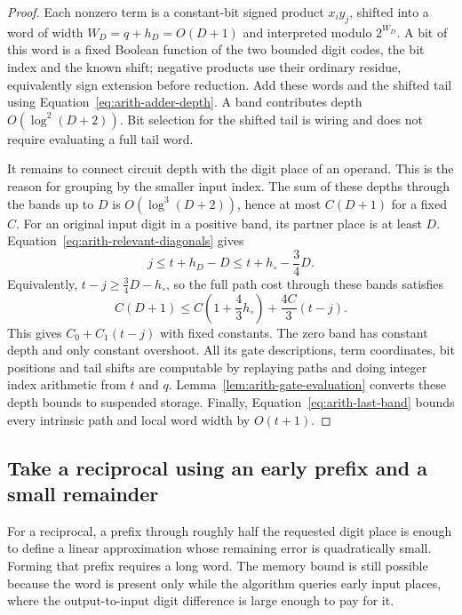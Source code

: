 \begin{proof}
Each nonzero term is a constant-bit signed product $x_i y_j$,
shifted into a word of width $W_D=q+h_D=O(D+1)$ and interpreted
modulo $2^{W_D}$.  A bit of this word is a fixed Boolean function
of the two bounded digit codes, the bit index and the known shift;
negative products use their ordinary residue, equivalently sign
extension before reduction.  Add these words and the shifted tail
using Equation~\eqref{eq:arith-adder-depth}.  A band contributes
depth $O(\log^2(D+2))$.  Bit selection for the shifted tail is
wiring and does not require evaluating a full tail word.

It remains to connect circuit depth with the digit place of an operand. This is the reason for grouping by the smaller input index. The sum of these depths through the bands up to $D$ is
$O(\log^3(D+2))$, hence at most $C(D+1)$ for a fixed $C$.
For an original input digit in a positive band, its partner place
is at least $D$.  Equation~\eqref{eq:arith-relevant-diagonals} gives
\begin{equation}
 j\leq t+h_D-D
       \leq t+h_\circ-\frac34D.
 \label{eq:arith-multiplication-latency}
\end{equation}
Equivalently, $t-j\geq\tfrac34D-h_\circ$, so the full path cost
through these bands satisfies
\[
 C(D+1)\leq C\left(1+\frac43h_\circ\right)
                   +\frac{4C}{3}(t-j).
\]
This gives $C_0+C_1(t-j)$ with fixed constants.  The zero band
has constant depth and only constant overshoot.  All its gate
descriptions, term coordinates, bit positions and tail shifts are
computable by replaying paths and doing integer index arithmetic
from $t$ and $q$.  Lemma~\ref{lem:arith-gate-evaluation} converts these
depth bounds to suspended storage.  Finally,
Equation~\eqref{eq:arith-last-band} bounds every intrinsic path
and local word width by $O(t+1)$.
\end{proof}

\subsection{Take a reciprocal using an early prefix and a small remainder}

For a reciprocal, a prefix through roughly half the requested digit place is enough to define a linear approximation whose remaining error is quadratically small. Forming that prefix requires a long word. The memory bound is still possible because the word is present only while the algorithm queries early input places, where the output-to-input digit difference is large enough to pay for it.


